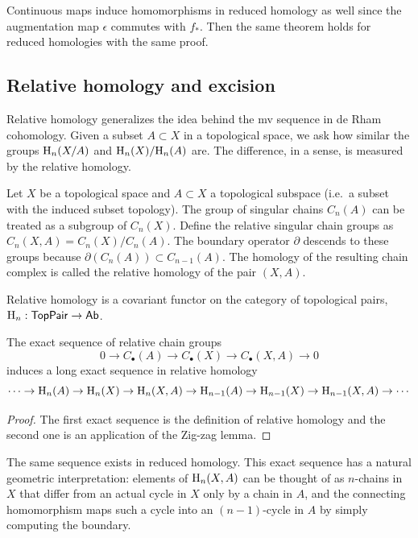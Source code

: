 Continuous maps induce homomorphisms in reduced homology as well since the augmentation map $\epsilon$ commutes with $f_\ast$. Then the same theorem holds for reduced homologies with the same proof.




\subsection{Relative homology and excision}

Relative homology generalizes the idea behind the \gls{mv} sequence in de Rham cohomology. Given a subset $A\subset X$ in a topological space, we ask how similar the groups $\mathrm{H}_n(X/A)$ and $\mathrm{H}_n(X)/\mathrm{H}_n(A)$ are. The difference, in a sense, is measured by the relative homology.

\begin{defn}
    Let $X$ be a topological space and $A\subset X$ a topological subspace (i.e.\ a subset with the induced subset topology). The group of singular chains $C_n(A)$ can be treated as a subgroup of $C_n(X)$. Define the relative singular chain groups as $C_n(X,A)=C_n(X)/C_n(A)$. The boundary operator $\partial$ descends to these groups because $\partial(C_n(A))\subset C_{n-1}(A)$. The homology of the resulting chain complex is called the relative homology of the pair $(X,A)$.
\end{defn}

Relative homology is a covariant functor on the category of topological pairs, $\mathrm{H}_n:\mathsf{TopPair}\to \mathsf{Ab}$.

\begin{prop}\label{exact seq of a pair}
    The exact sequence of relative chain groups
    \[0\to C_\bullet(A)\to C_\bullet (X)\to C_\bullet(X,A)\to 0 \]
    induces a long exact sequence in relative homology
    \[\cdots \to \mathrm{H}_n(A)\to \mathrm{H}_n(X)\to \mathrm{H}_n(X,A)\to \mathrm{H}_{n-1}(A)\to \mathrm{H}_{n-1}(X)\to \mathrm{H}_{n-1}(X,A)\to \cdots\]
\end{prop}
\begin{proof}
     The first exact sequence is the definition of relative homology and the second one is an application of the Zig-zag lemma.
\end{proof}

The same sequence exists in reduced homology. This exact sequence has a natural geometric interpretation: elements of $\mathrm{H}_n(X,A)$ can be thought of as $n$-chains in $X$ that differ from an actual cycle in $X$ only by a chain in $A$, and the connecting homomorphism maps such a cycle into an $(n-1)$-cycle in $A$ by simply computing the boundary.

